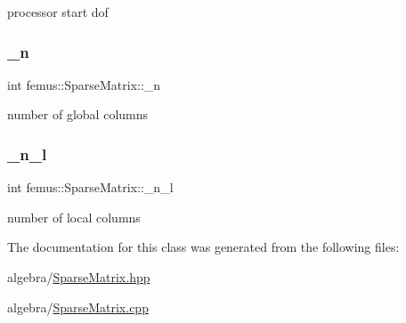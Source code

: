processor start dof 

\mbox{\label{classfemus_1_1_sparse_matrix_a4694b755be210277df88e61e8ae05ca6}} 
\subsubsection{\texorpdfstring{\+\_\+n}{\_n}}
{\footnotesize\ttfamily int femus\+::\+Sparse\+Matrix\+::\+\_\+n\hspace{0.3cm}{\ttfamily [protected]}}



number of global columns 

\mbox{\label{classfemus_1_1_sparse_matrix_af104c9620fa840f3f125104be3b84065}} 
\subsubsection{\texorpdfstring{\+\_\+n\+\_\+l}{\_n\_l}}
{\footnotesize\ttfamily int femus\+::\+Sparse\+Matrix\+::\+\_\+n\+\_\+l\hspace{0.3cm}{\ttfamily [protected]}}



number of local columns 



The documentation for this class was generated from the following files\+:\begin{DoxyCompactItemize}
\item 
algebra/\mbox{\hyperlink{_sparse_matrix_8hpp}{Sparse\+Matrix.\+hpp}}\item 
algebra/\mbox{\hyperlink{_sparse_matrix_8cpp}{Sparse\+Matrix.\+cpp}}\end{DoxyCompactItemize}

